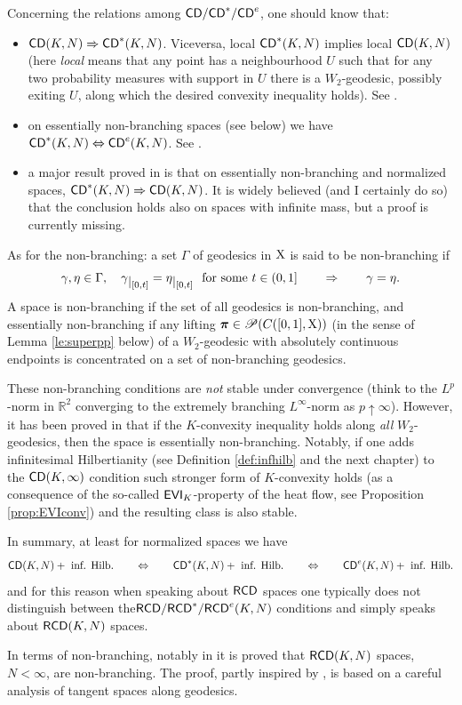 \documentclass[11pt]{article}
\numberwithin{equation}{section}
\newcommand{\R}{\mathbb{R}}
\newcommand{\ppi}{{\mbox{\boldmath$\pi$}}}
\newcommand{\restr}[1]{\lower3pt\hbox{$|_{#1}$}}
\newcommand{\pr}{\mathscr P}
\newcommand{\X}{{\rm X}}
\newcommand{\CD}{{\sf CD}}
\newcommand{\RCD}{{\sf RCD}}
\newcommand{\EVI}{{\sf EVI}}
\begin{document}
{{Concerning the relations among $\CD/\CD^*/\CD^e$, one should know that:
\begin{itemize}
\item[i)] $\CD(K,N)\Rightarrow\CD^*(K,N)$. Viceversa,  local $\CD^*(K,N)$ implies  local $\CD(K,N)$ (here \emph{local} means that any point has a neighbourhood $U$ such that for any two probability measures with support in $U$ there is a $W_2$-geodesic, possibly exiting $U$, along which the desired convexity inequality holds). See \cite{BacherSturm10}.
\item[ii)] on essentially non-branching spaces (see below) we have $\CD^*(K,N)\Leftrightarrow\CD^e(K,N)$. See \cite{Erbar-Kuwada-Sturm13}.
\item[iii)] a major result proved in \cite{CavMil16} is that on essentially non-branching and normalized spaces, $\CD^*(K,N)\Rightarrow\CD(K,N)$. It is widely believed (and I certainly do so) that the conclusion holds also on spaces with infinite mass, but a proof is currently missing.
\end{itemize}
As for the non-branching: a set $\Gamma$ of geodesics in $\X$ is said to be non-branching if 
\[
\gamma,\eta\in\Gamma,\quad \gamma\restr{[0,t]}=\eta\restr{[0,t]}\ \text{ for some $t\in(0,1]$}\qquad\Rightarrow\qquad \gamma=\eta.
\]
A space is non-branching if the set of all geodesics is non-branching, and essentially non-branching if any lifting $\ppi\in\pr(C([0,1],\X))$ (in the sense of Lemma \ref{le:superpp} below) of a $W_2$-geodesic with absolutely continuous endpoints is concentrated on a set of non-branching geodesics. 

These non-branching conditions are \emph{not} stable under convergence (think to the $L^p$-norm in $\R^2$ converging to the extremely branching $L^\infty$-norm as $p\uparrow\infty$). However, it has been proved in \cite{RajalaSturm12} that if the  $K$-convexity inequality holds along \emph{all} $W_2$-geodesics, then the space is essentially non-branching. Notably, if one adds  infinitesimal Hilbertianity (see Definition \ref{def:infhilb} and the next chapter) to the $\CD(K,\infty)$ condition  such stronger form of $K$-convexity holds (as a consequence of the so-called $\EVI_K$-property of the heat flow, see Proposition \ref{prop:EVIconv}) and the resulting class is also stable.

In summary, at least for normalized spaces we have
\begin{equation}
\label{eq:equivcd}
\CD(K,N)+\text{ inf. Hilb.}\qquad\Leftrightarrow\qquad \CD^*(K,N)+\text{ inf. Hilb.}
\qquad\Leftrightarrow\qquad \CD^e(K,N)+\text{ inf. Hilb.}
\end{equation}
and for this reason when speaking about $\RCD$ spaces one typically does not distinguish between the\linebreak $\RCD/\RCD^*/\RCD^e(K,N)$ conditions and simply speaks about $\RCD(K,N)$ spaces.

In terms of non-branching, notably in \cite{Deng20} it is proved that $\RCD(K,N)$ spaces, $N<\infty$, are non-branching. The proof, partly inspired by \cite{ColdingNaber12}, is based on a careful analysis of tangent spaces along geodesics.






}}
\end{document}
